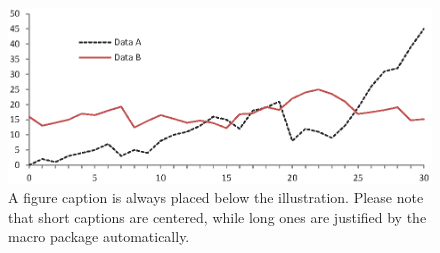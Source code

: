 \documentclass[runningheads]{llncs}
\begin{document}
\begin{figure}
\includegraphics[width=\textwidth]{fig1.eps}
\caption{A figure caption is always placed below the illustration.
Please note that short captions are centered, while long ones are
justified by the macro package automatically.} \label{fig1}
\end{figure}
\end{document}
